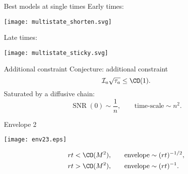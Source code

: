 \documentclass{beamer}%
\DeclareMathOperator{\SNR}{SNR}
\newcommand{\initial}{\mathcal{I}}
\begin{document}

\begin{frame}{Best models at single times}
%
 Early times:
 \begin{center}
   \texttt{[image: multistate\_shorten.svg]}
 \end{center}
 Late times:
 \begin{center}
   \texttt{[image: multistate\_sticky.svg]}
 \end{center}
%
\end{frame}


\begin{frame}{Additional constraint}
%
 Conjecture: additional constraint
 \begin{equation*}
   \initial_a\sqrt{\tau_a} \leq \CO(1).
 \end{equation*}
 Saturated by a diffusive chain:
 \begin{equation*}
   \SNR(0) \sim \frac{1}{n},
   \qquad
   \text{time-scale} \sim n^2.
 \end{equation*}
%
\end{frame}


\begin{frame}{Envelope 2}
%
 \begin{center}
   \texttt{[image: env23.eps]}
 \end{center}

 \begin{equation*}
 \begin{aligned}
   rt &< \CO(M^2), &\quad
   \text{envelope} &\sim (rt)^{-1/2}, \\
   rt &> \CO(M^2), &
   \text{envelope} &\sim (rt)^{-1} .
 \end{aligned}
 \end{equation*}
%
\end{frame}
\end{document}
